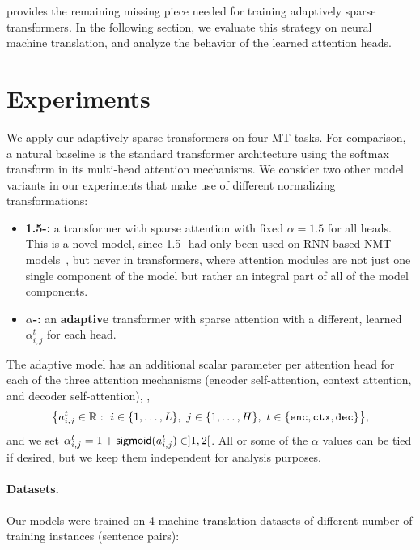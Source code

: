  provides the remaining missing
piece needed for training adaptively sparse transformers. In the
following section, we evaluate this strategy on neural machine
translation, and analyze the behavior of the learned attention heads.

\section{Experiments}

\noindent We apply our adaptively sparse transformers on four MT tasks.
For comparison, a natural baseline is the standard transformer
architecture using the softmax transform in its multi-head attention mechanisms.
We consider two other model variants in our experiments that make use of different
normalizing transformations:

\begin{itemize}
    \item \textbf{1.5-\entmaxtext:} a transformer with sparse \entmaxtext
          attention with fixed $\alpha=1.5$ for all heads. This is a novel model,
          since 1.5-\entmaxtext{} had only been used on
          RNN-based NMT models~\citep{entmax}, but never
          in transformers, where attention modules are not just one single
          component of the model but rather an integral part of all of
          the model components.%
    \item \textbf{\boldmath $\alpha$-\entmaxtext:} an \textbf{adaptive}
          transformer with sparse \entmaxtext attention with a different,
          learned $\alpha_{i,j}^t$ for each head.
\end{itemize}

The adaptive model has an additional scalar parameter per attention
head for each of the three attention mechanisms (encoder
self-attention, context attention, and decoder self-attention), \ie,
\begin{equation}
    \big \{ a_{i,j}^{t} \in \mathbb{R}:~
    i \in \{1, \dots, L\},~
    j \in \{1, \dots, H\},~
    t \in \{\texttt{enc}, \texttt{ctx}, \texttt{dec}\} \big\},
\end{equation}
and we set $\alpha_{i,j}^t = 1 + \operatorname*{\mathsf{sigmoid}}(a_{i,j}^t) \in ]1, 2[$.
All or some of the $\alpha$ values can be tied if desired, but we
keep them independent for analysis purposes.

\paragraph*{Datasets.} Our models were trained on 4 machine
translation datasets of different number of training instances
(sentence pairs):

